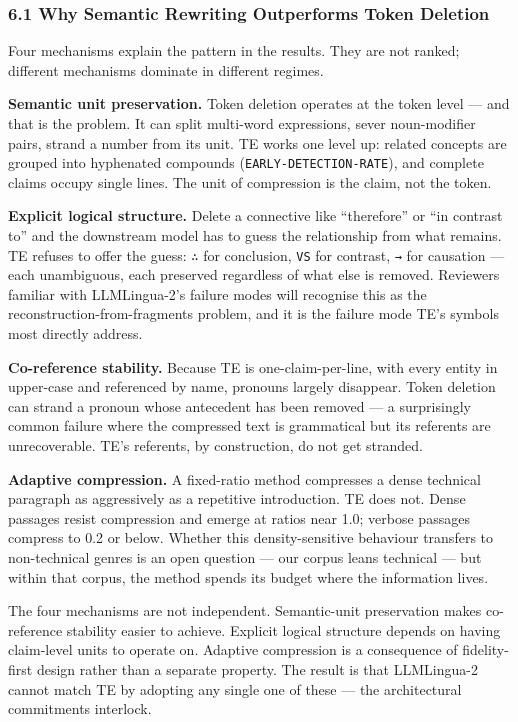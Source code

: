 \documentclass[
]{article}
\begin{document}
\subsubsection{6.1 Why Semantic Rewriting Outperforms Token
Deletion}\label{why-semantic-rewriting-outperforms-token-deletion}

Four mechanisms explain the pattern in the results. They are not ranked;
different mechanisms dominate in different regimes.

\textbf{Semantic unit preservation.} Token deletion operates at the
token level --- and that is the problem. It can split multi-word
expressions, sever noun-modifier pairs, strand a number from its unit.
TE works one level up: related concepts are grouped into hyphenated
compounds (\texttt{EARLY-DETECTION-RATE}), and complete claims occupy
single lines. The unit of compression is the claim, not the token.

\textbf{Explicit logical structure.} Delete a connective like
``therefore'' or ``in contrast to'' and the downstream model has to
guess the relationship from what remains. TE refuses to offer the guess:
\texttt{∴} for conclusion, \texttt{VS} for contrast, \texttt{→} for
causation --- each unambiguous, each preserved regardless of what else
is removed. Reviewers familiar with LLMLingua-2's failure modes will
recognise this as the reconstruction-from-fragments problem, and it is
the failure mode TE's symbols most directly address.

\textbf{Co-reference stability.} Because TE is one-claim-per-line, with
every entity in upper-case and referenced by name, pronouns largely
disappear. Token deletion can strand a pronoun whose antecedent has been
removed --- a surprisingly common failure where the compressed text is
grammatical but its referents are unrecoverable. TE's referents, by
construction, do not get stranded.

\textbf{Adaptive compression.} A fixed-ratio method compresses a dense
technical paragraph as aggressively as a repetitive introduction. TE
does not. Dense passages resist compression and emerge at ratios near
1.0; verbose passages compress to 0.2 or below. Whether this
density-sensitive behaviour transfers to non-technical genres is an open
question --- our corpus leans technical --- but within that corpus, the
method spends its budget where the information lives.

The four mechanisms are not independent. Semantic-unit preservation
makes co-reference stability easier to achieve. Explicit logical
structure depends on having claim-level units to operate on. Adaptive
compression is a consequence of fidelity-first design rather than a
separate property. The result is that LLMLingua-2 cannot match TE by
adopting any single one of these --- the architectural commitments
interlock.
\end{document}
